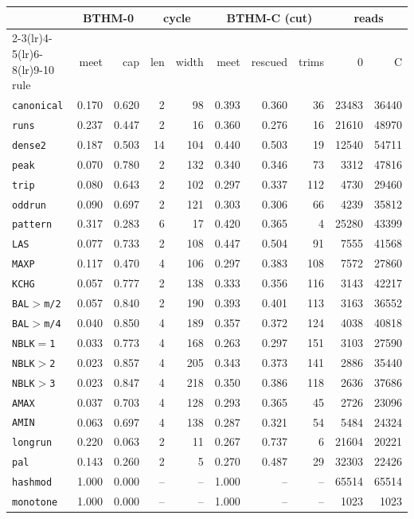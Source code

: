 \begin{tabular}{@{}lrrrrrrrrr@{}}
\toprule
 & \multicolumn{2}{c}{BTHM-0} & \multicolumn{2}{c}{cycle} & \multicolumn{3}{c}{BTHM-C (cut)} & \multicolumn{2}{c}{reads} \\
\cmidrule(lr){2-3}\cmidrule(lr){4-5}\cmidrule(lr){6-8}\cmidrule(lr){9-10}
rule & meet & cap & len & width & meet & rescued & trims & 0 & C \\
\midrule
\texttt{canonical} & 0.170 & 0.620 & 2 & 98 & 0.393 & 0.360 & 36 & 23483 & 36440 \\
\texttt{runs} & 0.237 & 0.447 & 2 & 16 & 0.360 & 0.276 & 16 & 21610 & 48970 \\
\texttt{dense2} & 0.187 & 0.503 & 14 & 104 & 0.440 & 0.503 & 19 & 12540 & 54711 \\
\texttt{peak} & 0.070 & 0.780 & 2 & 132 & 0.340 & 0.346 & 73 & 3312 & 47816 \\
\texttt{trip} & 0.080 & 0.643 & 2 & 102 & 0.297 & 0.337 & 112 & 4730 & 29460 \\
\texttt{oddrun} & 0.090 & 0.697 & 2 & 121 & 0.303 & 0.306 & 66 & 4239 & 35812 \\
\texttt{pattern} & 0.317 & 0.283 & 6 & 17 & 0.420 & 0.365 & 4 & 25280 & 43399 \\
\texttt{LAS} & 0.077 & 0.733 & 2 & 108 & 0.447 & 0.504 & 91 & 7555 & 41568 \\
\texttt{MAXP} & 0.117 & 0.470 & 4 & 106 & 0.297 & 0.383 & 108 & 7572 & 27860 \\
\texttt{KCHG} & 0.057 & 0.777 & 2 & 138 & 0.333 & 0.356 & 116 & 3143 & 42217 \\
\texttt{BAL$>$m/2} & 0.057 & 0.840 & 2 & 190 & 0.393 & 0.401 & 113 & 3163 & 36552 \\
\texttt{BAL$>$m/4} & 0.040 & 0.850 & 4 & 189 & 0.357 & 0.372 & 124 & 4038 & 40818 \\
\texttt{NBLK$=$1} & 0.033 & 0.773 & 4 & 168 & 0.263 & 0.297 & 151 & 3103 & 27590 \\
\texttt{NBLK$>$2} & 0.023 & 0.857 & 4 & 205 & 0.343 & 0.373 & 141 & 2886 & 35440 \\
\texttt{NBLK$>$3} & 0.023 & 0.847 & 4 & 218 & 0.350 & 0.386 & 118 & 2636 & 37686 \\
\texttt{AMAX} & 0.037 & 0.703 & 4 & 128 & 0.293 & 0.365 & 45 & 2726 & 23096 \\
\texttt{AMIN} & 0.063 & 0.697 & 4 & 138 & 0.287 & 0.321 & 54 & 5484 & 24324 \\
\texttt{longrun} & 0.220 & 0.063 & 2 & 11 & 0.267 & 0.737 & 6 & 21604 & 20221 \\
\texttt{pal} & 0.143 & 0.260 & 2 & 5 & 0.270 & 0.487 & 29 & 32303 & 22426 \\
\texttt{hashmod} & 1.000 & 0.000 & -- & -- & 1.000 & -- & -- & 65514 & 65514 \\
\texttt{monotone} & 1.000 & 0.000 & -- & -- & 1.000 & -- & -- & 1023 & 1023 \\
\bottomrule
\end{tabular}
